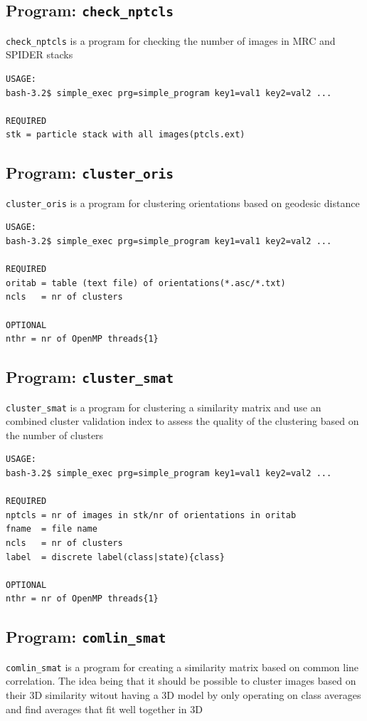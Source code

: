 \documentclass[a4paper,11pt]{article}
\newcommand{\prgname}[1]{\textcolor{NavyBlue}{\texttt{#1}}}
\begin{document}
\subsection{Program: \prgname{check\_nptcls}}
\label{check_nptcls}
\prgname{check\_nptcls} is a program for checking the number of images in MRC and SPIDER stacks

\begin{verbatim}
USAGE:
bash-3.2$ simple_exec prg=simple_program key1=val1 key2=val2 ...

REQUIRED
stk = particle stack with all images(ptcls.ext)
\end{verbatim}

\subsection{Program: \prgname{cluster\_oris}}
\label{cluster_oris}
\prgname{cluster\_oris} is a program for clustering orientations based on geodesic distance

\begin{verbatim}
USAGE:
bash-3.2$ simple_exec prg=simple_program key1=val1 key2=val2 ...

REQUIRED
oritab = table (text file) of orientations(*.asc/*.txt)
ncls   = nr of clusters

OPTIONAL
nthr = nr of OpenMP threads{1}
\end{verbatim}

\subsection{Program: \prgname{cluster\_smat}}
\label{cluster_smat}
\prgname{cluster\_smat} is a program for clustering a similarity matrix and use an combined cluster validation index to assess the quality of the clustering based on the number of clusters

\begin{verbatim}
USAGE:
bash-3.2$ simple_exec prg=simple_program key1=val1 key2=val2 ...

REQUIRED
nptcls = nr of images in stk/nr of orientations in oritab
fname  = file name
ncls   = nr of clusters
label  = discrete label(class|state){class}

OPTIONAL
nthr = nr of OpenMP threads{1}
\end{verbatim}

\subsection{Program: \prgname{comlin\_smat}}
\label{comlin_smat}
\prgname{comlin\_smat} is a program for creating a similarity matrix based on common line correlation. The idea being that it should be possible to cluster images based on their 3D similarity witout having a 3D model by only operating on class averages and find averages that fit well together in 3D
\end{document}
